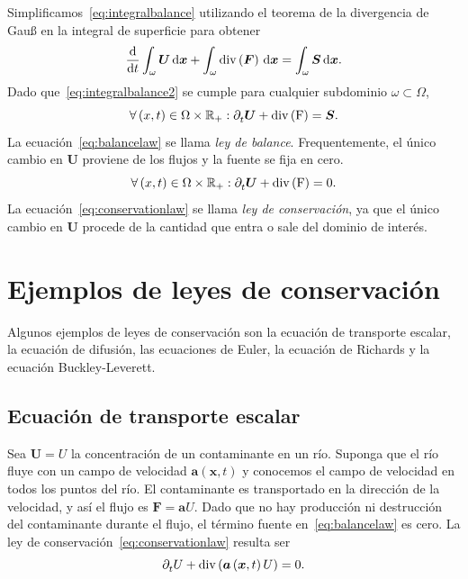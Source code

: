 Simplificamos~\eqref{eq:integralbalance} utilizando el teorema de la
divergencia de Gauß en la integral de superficie para obtener
\begin{equation}\label{eq:integralbalance2}
	\diff{}{t}
	\int_{\omega}
	\bm{U}\dl{\bm{x}}
	+\int_{\omega}
	\operatorname{div}
	\left(\bm{F}\right)\dl{\bm{x}}=
	\int_{\omega}
	\bm{S}\dl{\bm{x}}.
\end{equation}
Dado que~\eqref{eq:integralbalance2} se cumple para cualquier
subdominio $\omega\subset\Omega$,
\begin{equation}\label{eq:balancelaw}
	\forall\left(x,t\right)\in\Omega\times\mathbb{R}_{+}:
	\difcp{\bm{U}}{t}+
	\operatorname{\operatorname{div}
		\left(\bm{F}\right)}=
	\bm{S}.
\end{equation}
La ecuación~\eqref{eq:balancelaw} se llama \emph{ley de balance}.
Frequentemente, el único cambio en $\bm{U}$ proviene de los
flujos y la fuente se fija en cero.
\begin{equation}\label{eq:conservationlaw}
	\forall\left(x,t\right)\in
	\Omega\times\mathbb{R}_{+}:
	\difcp{\bm{U}}{t}+
	\operatorname{\operatorname{div}
		\left(\bm{F}\right)}=
	0.
\end{equation}
La ecuación~\eqref{eq:conservationlaw} se llama
\emph{ley de conservación}, ya que el único cambio en $\bm{U}$
procede de la cantidad que entra o sale del dominio de interés.

\section*{Ejemplos de leyes de conservación}

Algunos ejemplos de leyes de conservación son la ecuación de
transporte escalar, la ecuación de difusión, las ecuaciones de Euler,
la ecuación de Richards y la ecuación Buckley-Leverett.

\subsection*{Ecuación de transporte escalar}

Sea $\bm{U}=U$ la concentración de un contaminante en un río.
Suponga que el río fluye con un campo de velocidad
$\bm{a}\left(\bm{x},t\right)$ y conocemos el campo de
velocidad en todos los puntos del río.
El contaminante es transportado en la dirección de la velocidad, y
así el flujo es $\bm{F}=\bm{a}U$.
Dado que no hay producción ni destrucción del contaminante durante el
flujo, el término fuente en~\eqref{eq:balancelaw} es cero.
La ley de conservación~\eqref{eq:conservationlaw} resulta ser
\begin{equation}
	\difcp{U}{t}+
	\operatorname{div}
	\left(\bm{a}\left(\bm{x},t\right)U\right)=
	0.
\end{equation}


